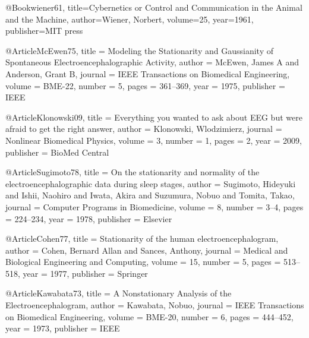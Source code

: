 @Book{wiener61,
    title={{Cybernetics or Control and Communication in the Animal and the Machine}},
    author={Wiener, Norbert},
    volume={25},
    year={1961},
    publisher={MIT press}
}

@Article{McEwen75,
    title     = {Modeling the {S}tationarity and {G}aussianity of {S}pontaneous 
                 {E}lectroencephalographic {A}ctivity},
    author    = {McEwen, James A 
                 and Anderson, Grant B},
    journal   = {IEEE {T}ransactions on {B}iomedical {E}ngineering},
    volume    = {BME-22},
    number    = {5},
    pages     = {361--369},
    year      = {1975},
    publisher = {IEEE}
}

@Article{Klonowski09,
    title     = {Everything you wanted to ask about EEG but were afraid to get the right answer},
    author    = {Klonowski, Wlodzimierz},
    journal   = {Nonlinear Biomedical Physics},
    volume    = {3},
    number    = {1},
    pages     = {2},
    year      = {2009},
    publisher = {BioMed Central}
}

@Article{Sugimoto78,
    title     = {On the stationarity and normality of the electroencephalographic data during 
                 sleep stages},
    author    = {Sugimoto, Hideyuki 
                 and Ishii, Naohiro 
                 and Iwata, Akira 
                 and Suzumura, Nobuo 
                 and Tomita, Takao},
    journal   = {Computer {P}rograms in {B}iomedicine},
    volume    = {8},
    number    = {3--4},
    pages     = {224--234},
    year      = {1978},
    publisher = {Elsevier}
}

@Article{Cohen77,
    title     = {Stationarity of the human electroencephalogram},
    author    = {Cohen, Bernard Allan 
                 and Sances, Anthony},
    journal   = {Medical and Biological Engineering and Computing},
    volume    = {15},
    number    = {5},
    pages     = {513--518},
    year      = {1977},
    publisher = {Springer}
}

@Article{Kawabata73,
    title     = {A {N}onstationary {A}nalysis of the {E}lectroencephalogram},
    author    = {Kawabata, Nobuo},
    journal   = {IEEE Transactions on Biomedical Engineering},
    volume    = {BME-20},
    number    = {6},
    pages     = {444--452},
    year      = {1973},
    publisher = {IEEE}
}


